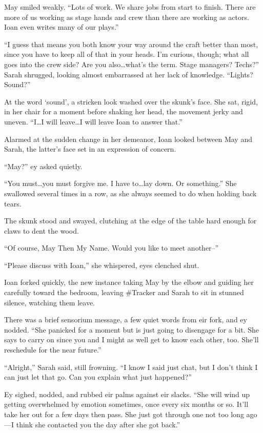 May smiled weakly. ``Lots of work. We share jobs from start to finish. There are more of us working as stage hands and crew than there are working as actors. Ioan even writes many of our plays.''

``I guess that means you both know your way around the craft better than most, since you have to keep all of that in your heads. I'm curious, though; what all goes into the crew side? Are you also\ldots what's the term. Stage managers? Techs?'' Sarah shrugged, looking almost embarrassed at her lack of knowledge. ``Lights? Sound?''

At the word `sound', a stricken look washed over the skunk's face. She sat, rigid, in her chair for a moment before shaking her head, the movement jerky and uneven. ``I\ldots I will leave\ldots I will leave Ioan to answer that.''

Alarmed at the sudden change in her demeanor, Ioan looked between May and Sarah, the latter's face set in an expression of concern.

``May?'' ey asked quietly.

``You must\ldots you must forgive me. I have to\ldots lay down. Or something.'' She swallowed several times in a row, as she always seemed to do when holding back tears.

The skunk stood and swayed, clutching at the edge of the table hard enough for claws to dent the wood.

``Of course, May Then My Name. Would you like to meet another--''

``Please discuss with Ioan,'' she whispered, eyes clenched shut.

Ioan forked quickly, the new instance taking May by the elbow and guiding her carefully toward the bedroom, leaving \#Tracker and Sarah to sit in stunned silence, watching them leave.

There was a brief sensorium message, a few quiet words from eir fork, and ey nodded. ``She panicked for a moment but is just going to disengage for a bit. She says to carry on since you and I might as well get to know each other, too. She'll reschedule for the near future.''

``Alright,'' Sarah said, still frowning. ``I know I said just chat, but I don't think I can just let that go. Can you explain what just happened?''

Ey sighed, nodded, and rubbed eir palms against eir slacks. ``She will wind up getting overwhelmed by emotion sometimes, once every six months or so. It'll take her out for a few days then pass. She just got through one not too long ago—I think she contacted you the day after she got back.''

